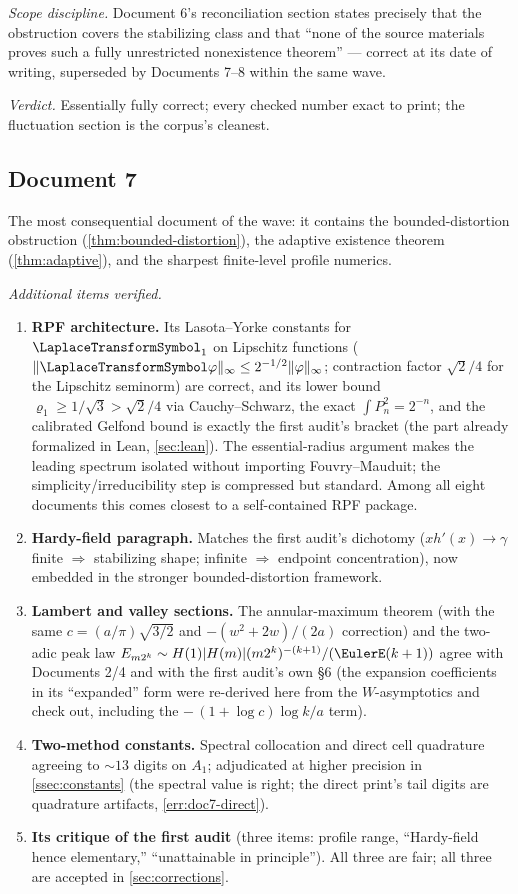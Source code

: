 \documentclass[11pt,oneside]{article}
\theoremstyle{definition}
\theoremstyle{remark}
\begin{document}
\emph{Scope discipline.}  Document 6's reconciliation section states
precisely that the obstruction covers the stabilizing class and that
``none of the source materials proves such a fully unrestricted
nonexistence theorem'' --- correct at its date of writing, superseded
by Documents 7--8 within the same wave.

\emph{Verdict.}  Essentially fully correct; every checked number exact
to print; the fluctuation section is the corpus's cleanest.

\subsection{Document 7}
\label{ssec:doc7}

The most consequential document of the wave: it contains the
bounded-distortion obstruction (\cref{thm:bounded-distortion}), the
adaptive existence theorem (\cref{thm:adaptive}), and the sharpest
finite-level profile numerics.

\emph{Additional items verified.}
\begin{enumerate}
\item \textbf{RPF architecture.}  Its Lasota--Yorke constants for
$\LaplaceTransformSymbol_1$ on Lipschitz functions ($\|\LaplaceTransformSymbol\varphi\|_\infty\le
2^{-1/2}\|\varphi\|_\infty$; contraction factor $\sqrt2/4$ for the
Lipschitz seminorm) are correct, and its lower bound
$\varrho_1\ge1/\sqrt3>\sqrt2/4$ via Cauchy--Schwarz, the exact
$\int P_n^2=2^{-n}$, and the calibrated Gelfond bound is exactly the
first audit's bracket (the part already formalized in Lean,
\cref{sec:lean}).  The essential-radius argument makes the leading
spectrum isolated without importing Fouvry--Mauduit; the
simplicity/irreducibility step is compressed but standard.  Among all
eight documents this comes closest to a self-contained RPF package.
\item \textbf{Hardy-field paragraph.}  Matches the first audit's
dichotomy ($xh'(x)\to\gamma$ finite $\Rightarrow$ stabilizing shape;
infinite $\Rightarrow$ endpoint concentration), now embedded in the
stronger bounded-distortion framework.
\item \textbf{Lambert and valley sections.}  The annular-maximum
theorem (with the same $c=(a/\pi)\sqrt{3/2}$ and
$-(w^2+2w)/(2a)$ correction) and the two-adic peak law
$E_{m2^k}\sim H(1)|H(m)|(m2^k)^{-(k+1)}/(\EulerE(k+1))$ agree with
Documents 2/4 and with the first audit's own \S6 (the expansion
coefficients in its ``expanded'' form were re-derived here from the
$W$-asymptotics and check out, including the $-\,(1+\log c)\log k/a$
term).
\item \textbf{Two-method constants.}  Spectral collocation and direct
cell quadrature agreeing to $\sim\!13$ digits on $A_1$; adjudicated at
higher precision in \cref{ssec:constants} (the spectral value is right;
the direct print's tail digits are quadrature artifacts,
\cref{err:doc7-direct}).
\item \textbf{Its critique of the first audit} (three items: profile
range, ``Hardy-field hence elementary,'' ``unattainable in
principle'').  All three are fair; all three are accepted in
\cref{sec:corrections}.
\end{enumerate}
\end{document}
